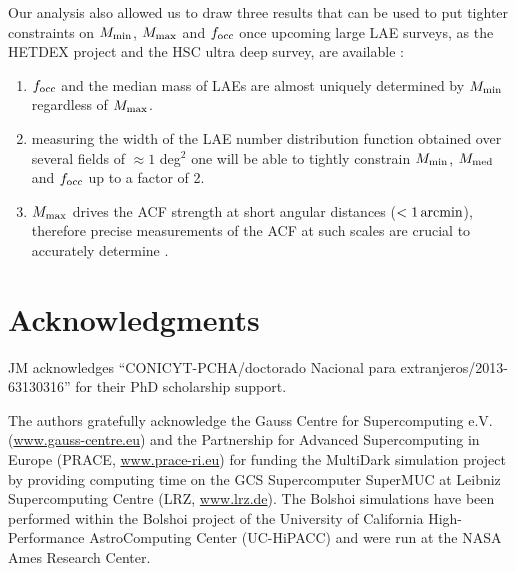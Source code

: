 \documentclass{emulateapj}
\newcommand{\mmax}{{\ifmmode{{M_{\rm max}}}\else{${M_{\rm max}}$}\fi}}
\begin{document}
Our analysis also allowed us to draw three results that can be used to put tighter constraints on $M_{\rm min}$, $M_{\rm max}$ and $f_{\rm occ}$ once upcoming large LAE surveys, as the HETDEX project \citep{Hetdex2011} and the HSC ultra deep survey, are available :
\begin{enumerate}
\item $f_{\rm occ}$ and the median mass of LAEs are almost uniquely determined by $M_{\rm min}$ regardless of $M_{\rm max}$. \item measuring the width of the LAE number distribution function obtained over several fields of $\approx 1$ deg$^2$ one will be able to tightly constrain  $M_{\rm min}$, $M_{\rm med}$ and $f_{\rm occ}$ up to a factor of  2. 
\item  $M_{\rm max}$ drives the ACF strength at short angular distances ($<1\,\rm arcmin$), therefore precise measurements of the ACF at such scales are crucial to accurately determine \mmax.
\end{enumerate}



\section*{Acknowledgments} 

JM acknowledges ``CONICYT-PCHA/doctorado Nacional para
extranjeros/2013-63130316'' for their PhD scholarship support.  

The authors gratefully acknowledge the Gauss Centre for Supercomputing
e.V. (\url{www.gauss-centre.eu}) and the Partnership for Advanced
Supercomputing in Europe (PRACE, \url{www.prace-ri.eu}) for funding the
MultiDark simulation project by providing computing time on the GCS
Supercomputer SuperMUC at Leibniz Supercomputing Centre (LRZ,
\url{www.lrz.de}). The Bolshoi simulations have been performed within the
Bolshoi project of the University of California High-Performance
AstroComputing Center (UC-HiPACC) and were run at the NASA Ames
Research Center. 




\end{document}
